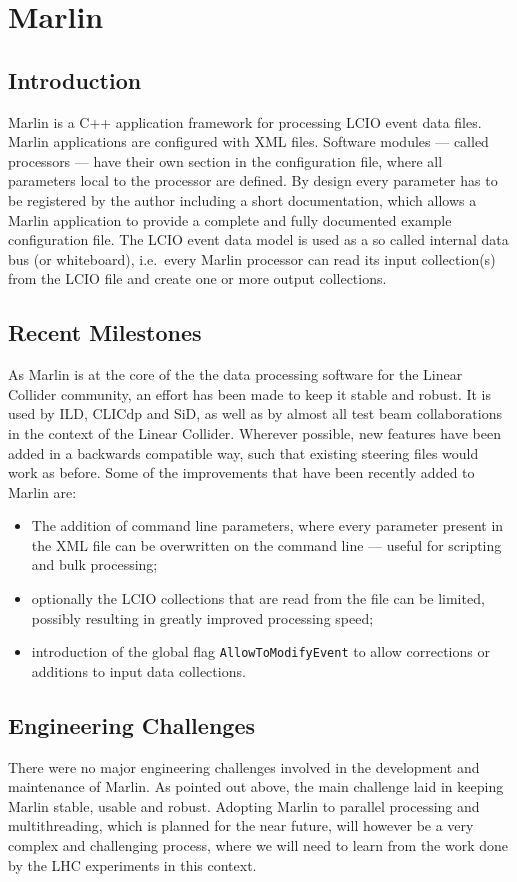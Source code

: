 \section{Marlin}

\subsection{Introduction}
Marlin\cite{Gaede2006177} is a C++ application framework for processing LCIO event data files. Marlin applications are configured with XML files. Software modules --- called processors --- have their own section in the configuration file, where all parameters local to the processor are defined. By design every parameter has to be registered by the author including a short documentation, which allows a Marlin application to provide a complete and fully documented example configuration file. The LCIO event data model is used as a so called internal data bus (or whiteboard), i.e.\ every Marlin processor can read its input collection(s) from the LCIO file and create one or more output collections.

\subsection{Recent Milestones}
As Marlin is at the core of the the data processing software for the Linear Collider community, an effort has been made to keep it stable and robust. It is used by ILD, CLICdp and SiD, as well as by almost all test beam collaborations in the context of the Linear Collider. Wherever possible, new features have been added in a backwards compatible way, such that existing steering files would work as before. Some of the improvements that have been recently added to Marlin are:
\begin{itemize}
	\item The addition of command line parameters, where every parameter present in the XML file can be overwritten on the command line --- useful for scripting and bulk processing;
	\item optionally the LCIO collections that are read from the file can be limited, possibly resulting in greatly improved processing speed;
	\item introduction of the global flag \texttt{AllowToModifyEvent} to allow corrections or additions to input data collections.
\end{itemize}

\subsection{Engineering Challenges}
There were no major engineering challenges involved in the development and maintenance of Marlin. As pointed out above, the main challenge laid in keeping Marlin stable, usable and robust. Adopting Marlin to parallel processing and multithreading, which is planned for the near future, will however be a very complex and challenging process, where we will need to learn from the work done by the LHC experiments in this context.

